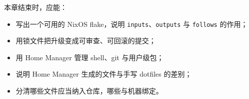 \begin{checkpoint}
本章结束时，应能：
\begin{itemize}
  \item 写出一个可用的 NixOS flake，说明 \texttt{inputs}、\texttt{outputs} 与 \texttt{follows} 的作用；
  \item 用锁文件把升级变成可审查、可回滚的提交；
  \item 用 Home Manager 管理 shell、git 与用户级包；
  \item 说明 Home Manager 生成的文件与手写 dotfiles 的差别；
  \item 分清哪些文件应当纳入仓库，哪些与机器绑定。
\end{itemize}
\end{checkpoint}
